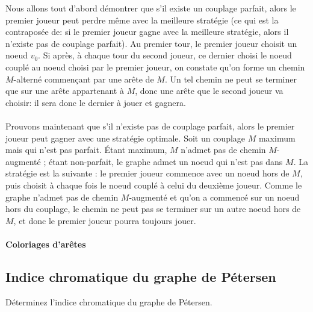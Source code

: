\begin{solution}
Nous allons tout d'abord démontrer que s'il existe un couplage parfait, alors le premier joueur peut perdre même avec la meilleure stratégie (ce qui est la contraposée de: si le premier joueur gagne avec la meilleure stratégie, alors il n'existe pas de couplage parfait). Au premier tour, le premier joueur choisit un noeud $v_0$. Si après, à chaque tour du second joueur, ce dernier choisi le noeud couplé au noeud choisi par le premier joueur, on constate qu'on forme un chemin $M$-alterné commençant par une arête de $M$. Un tel chemin ne peut se terminer que sur une arête appartenant à $M$, donc une arête que le second joueur va choisir: il sera donc le dernier à jouer et gagnera.\\
\\
Prouvons maintenant que s'il n'existe pas de couplage parfait, alors le premier joueur peut gagner avec une stratégie optimale.
Soit un couplage $M$ maximum mais qui n'est pas parfait. Étant maximum, $M$ n'admet pas de chemin $M$-augmenté ; étant non-parfait, le graphe admet un noeud qui n'est pas dans $M$. La stratégie est la suivante : le premier joueur commence avec un noeud hors de $M$, puis choisit à chaque fois le noeud couplé à celui du deuxième joueur. Comme le graphe n'admet pas de chemin $M$-augmenté et qu'on a commencé sur un noeud hors du couplage, le chemin ne peut pas se terminer sur un autre noeud hors de $M$, et donc le premier joueur pourra toujours jouer.
\end{solution}

\paragraph{Coloriages d'arêtes}

\subsection{Indice chromatique du graphe de Pétersen}
Déterminez l'indice chromatique du graphe de Pétersen.

